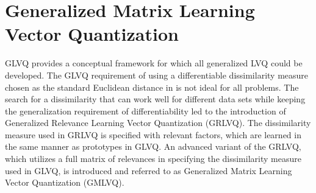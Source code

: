 \documentclass[english]{HSMW-Thesis}
\begin{document}
\section{Generalized Matrix Learning Vector Quantization}
GLVQ provides a conceptual framework for which all generalized LVQ could be developed. The GLVQ requirement of using a differentiable dissimilarity measure chosen as the standard Euclidean distance in \cite{sato1996generalized} is not ideal for all problems\cite{villmann2017can}. The search for a dissimilarity that can work well for different data sets while keeping the generalization requirement of differentiability led to the introduction of Generalized Relevance Learning Vector Quantization (GRLVQ)\cite{article}. The dissimilarity measure used in GRLVQ is specified with relevant factors, which are learned in the same manner as prototypes in GLVQ\cite{article}. An advanced variant of the GRLVQ, which utilizes a full matrix of relevances in specifying the dissimilarity measure used in GLVQ, is introduced and referred to as Generalized Matrix Learning Vector Quantization (GMLVQ)\cite{article}.
\end{document}
